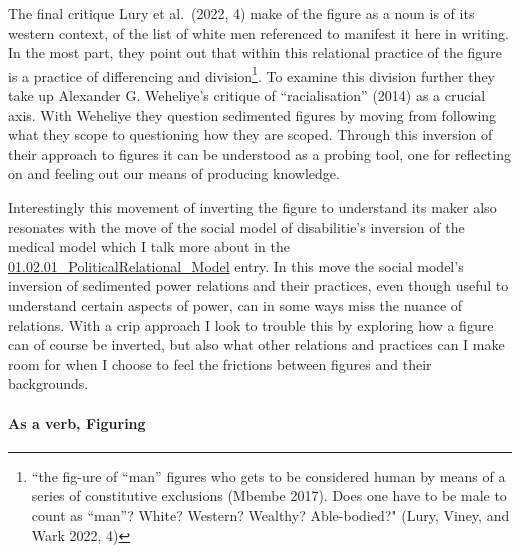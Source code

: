 The final critique Lury et al.~(2022, 4) make of the figure as a noun is
of its western context, of the list of white men referenced to manifest
it here in writing. In the most part, they point out that within this
relational practice of the figure is a practice of differencing and
division\footnote{``the fig-ure of ``man'' figures who gets to be
  considered human by means of a series of constitutive exclusions
  (Mbembe 2017). Does one have to be male to count as ``man''? White?
  Western? Wealthy? Able-bodied?" (Lury, Viney, and Wark 2022, 4)}. To
examine this division further they take up Alexander G. Weheliye's
critique of ``racialisation'' (2014) as a crucial axis. With Weheliye
they question sedimented figures by moving from following what they
scope to questioning how they are scoped. Through this inversion of
their approach to figures it can be understood as a probing tool, one
for reflecting on and feeling out our means of producing knowledge.

Interestingly this movement of inverting the figure to understand its
maker also resonates with the move of the social model of disabilitie's
inversion of the medical model which I talk more about in the
\href{../../01_Disability_justice_and_life_affirmation_flipping_the_table/sections/01.02.01_PoliticalRelational_Model.md}{01.02.01\_PoliticalRelational\_Model}
entry. In this move the social model's inversion of sedimented power
relations and their practices, even though useful to understand certain
aspects of power, can in some ways miss the nuance of relations. With a
crip approach I look to trouble this by exploring how a figure can of
course be inverted, but also what other relations and practices can I
make room for when I choose to feel the frictions between figures and
their backgrounds.

\hypertarget{as-a-verb-figuring}{%
\paragraph[As a verb,
Figuring]{\texorpdfstring{\protect\hypertarget{anchor}{}{}As a verb,
Figuring}{As a verb, Figuring}}\label{as-a-verb-figuring}}

